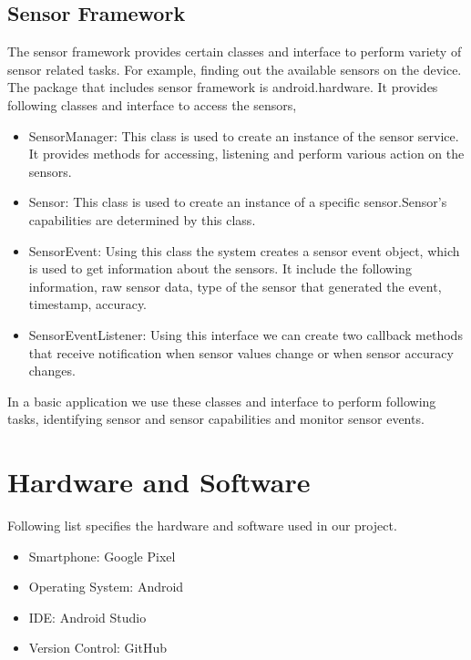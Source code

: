 \documentclass[conference]{IEEEtran}
\begin{document}
\subsection{Sensor Framework}
The sensor framework provides certain classes and interface to perform variety of sensor related tasks. For example, finding out the available sensors on the device.\\

The package that includes sensor framework is android.hardware. It provides following classes and interface to access the sensors,
\begin{itemize}
    \item SensorManager: This class is used to create an instance of the sensor service. It provides methods for accessing, listening and perform various action on the sensors.
    \item Sensor: This class is used to create an instance of a specific sensor.Sensor's capabilities are determined by this class.
    \item SensorEvent: Using this class the system creates a sensor event object, which is used to get information about the sensors. It include the following information, raw sensor data, type of the sensor that generated the event, timestamp, accuracy.
    \item SensorEventListener: Using this interface we can create two callback methods that receive notification when sensor values change or when sensor accuracy changes.
\end{itemize}
In a basic application we use these classes and interface to perform following tasks, identifying sensor and sensor capabilities and monitor sensor events.\\

\section{Hardware and Software}
Following list specifies the hardware and software used in our project.
\begin{itemize}
    \item Smartphone: Google Pixel
    \item Operating System: Android
    \item IDE: Android Studio
    \item Version Control: GitHub
\end{itemize}
\end{document}
